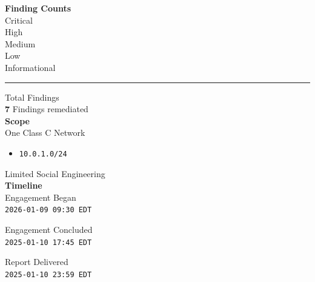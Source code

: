 \begin{minipage}[t]{0.25\textwidth}
    \textbf{Finding Counts}\\
    \small
    { \textbf{} Critical}\\
    { \textbf{} High}\\
    { \textbf{} Medium}\\
    { \textbf{} Low}\\
    { \textbf{} Informational}\\
    \rule{0.6\linewidth}{0.4pt}
    
    \textbf{} Total Findings\\

    \textbf{7} Findings remediated\\

    \normalsize
    \textbf{Scope}\\
    \small
    One Class C Network
    \vspace{-0.3cm}
    \begin{itemize}
        \item \texttt{10.0.1.0/24}
    \end{itemize}

    Limited Social Engineering\\

    \normalsize
    \textbf{Timeline}\\
    \small
    Engagement Began\\
    \texttt{2026-01-09 09:30 EDT}

    \medskip

    Engagement Concluded\\
    \texttt{2025-01-10 17:45 EDT}

    \medskip

    Report Delivered\\
    \texttt{2025-01-10 23:59 EDT}
\end{minipage}

\vspace{2.5cm}



\newpage